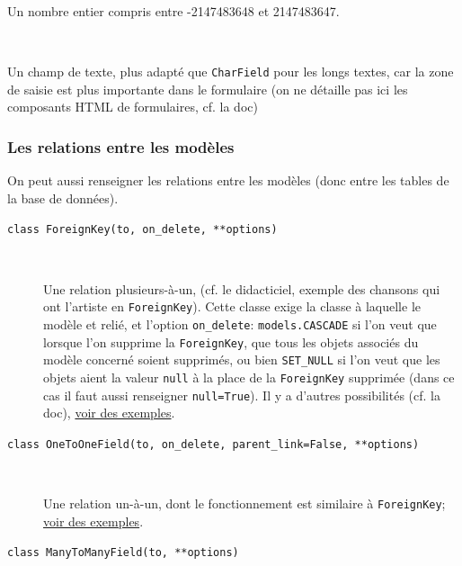 \documentclass[a4paper, 10pt]{article}
\begin{document}
{\begin{description}
    Un nombre entier compris entre -2147483648 et 2147483647.

    \item[\texttt{class TextField(**options)}]~

    Un champ de texte, plus adapté que \texttt{CharField} pour les longs textes, car la zone de saisie est plus importante dans le formulaire (on ne détaille pas ici les composants HTML de formulaires, cf. la doc)
\end{description}

\subsubsection{Les relations entre les modèles}

On  peut aussi renseigner les relations entre les modèles (donc entre les tables de la base de données).
\begin{description}
    \item[\texttt{class ForeignKey(to, on_delete, **options)}]~

    Une relation plusieurs-à-un, (cf. le didacticiel, exemple des chansons qui ont l'artiste en \texttt{ForeignKey}). Cette classe exige la classe à laquelle le modèle et relié, et l'option \texttt{on\_delete}: \texttt{models.CASCADE} si l'on veut que lorsque l'on supprime la \texttt{ForeignKey}, que tous les objets associés du modèle concerné soient supprimés, ou bien \texttt{SET\_NULL} si l'on veut que les objets aient la valeur \texttt{null} à la place de la \texttt{ForeignKey} supprimée (dans ce cas il faut aussi renseigner \texttt{null=True}). Il y a d'autres possibilités (cf. la doc), \href{https://docs.djangoproject.com/fr/2.0/topics/db/examples/many_to_one/}{voir des exemples}.

    \item[\texttt{class OneToOneField(to, on_delete, parent_link=False, **options)}]~

    Une relation un-à-un, dont le fonctionnement est similaire à \texttt{ForeignKey}; \href{https://docs.djangoproject.com/fr/2.0/topics/db/examples/one_to_one/}{voir des exemples}.

    \item[\texttt{class ManyToManyField(to, **options)}]~


\end{description}}
\end{document}
